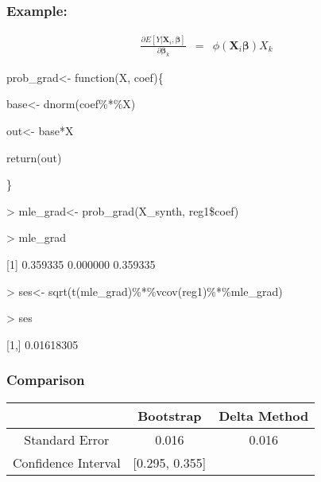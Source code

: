\documentclass{beamer}
\begin{document}
\begin{frame}
\frametitle{Example:}

\begin{eqnarray}
\frac{\partial E[Y| \boldsymbol{X}_{i}, \boldsymbol{\beta}]}{ \partial \boldsymbol{\beta}_{k}} & = & \phi(\boldsymbol{X}_{i} \boldsymbol{\beta})X_{k} \nonumber 
\end{eqnarray}

\begin{semiverbatim}

prob\_grad<- function(X, coef)\{

\hspace{0.3in}	base<- dnorm(coef\%*\%X)

\hspace{0.3in}	out<- base*X

\hspace{0.3in}	return(out)
	
\hspace{0.2in}\}

> mle\_grad<- prob\_grad(X\_synth, reg1\$coef)


> mle\_grad

[1] 0.359335 0.000000 0.359335

 
> ses<- sqrt(t(mle\_grad)\%*\%vcov(reg1)\%*\%mle\_grad)

 
> ses
           
[1,] 0.01618305


\end{semiverbatim}






\end{frame}


\begin{frame}
\frametitle{Comparison}

\begin{tabular}{ccc}
\hline
	& Bootstrap & Delta Method \\
\hline	
Standard Error &  0.016		& 	0.016	\\
Confidence Interval & [0.295, 0.355]	  & 		\\
\hline
\end{tabular}




\end{frame}
\end{document}
